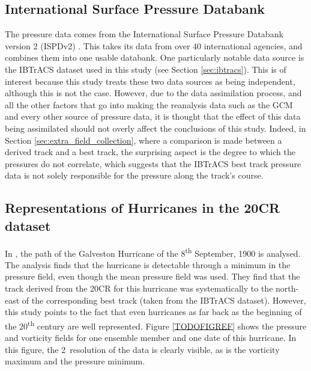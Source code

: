 \documentclass[pdftex,12pt,a4paper]{report}
\newcommand{\ts}{\textsuperscript}
\begin{document}
\subsection{International Surface Pressure Databank}
The pressure data comes from the International Surface Pressure Databank version 2 (ISPDv2)
\parencite{yin2008international}. This takes its data from over 40 international agencies, and
combines them into one usable databank. One particularly notable data source is the IBTrACS dataset
used in this study (see Section \ref{sec:ibtracs}). This is of interest because this study treats
these two data sources as being independent, although this is not the case. However, due to the data
assimilation process, and all the other factors that go into making the reanalysis data such as the
GCM and every other source of pressure data, it is thought that the effect of this data being
assimilated should not overly affect the conclusions of this study. Indeed, in Section
\ref{sec:extra_field_collection}, where a comparison is made between a derived track and a best
track, the surprising aspect is the degree to which the pressures do not correlate, which suggests
that the IBTrACS best track pressure data is not solely responsible for the pressure along the
track's course.


\subsection{Representations of Hurricanes in the 20CR dataset}

In \textcite{neff2013analysis}, the path of the Galveston Hurricane of the 8\ts{th} September, 1900
is analysed. The analysis finds that the hurricane is detectable through a minimum in the pressure
field, even though the mean pressure field was used. They find that the track derived from the 20CR
for this hurricane was systematically to the north-east of the corresponding best track (taken from
the IBTrACS dataset). However, this study points to the fact that even hurricanes as far back as the
beginning of the 20\ts{th} century are well represented. Figure \ref{TODOFIGREF} shows the pressure
and vorticity fields for one ensemble member and one date of this hurricane. In this figure, the
2\textdegree\ resolution of the data is clearly visible, as is the vorticity maximum and the
pressure minimum.

\end{document}
